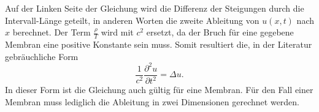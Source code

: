 Auf der Linken Seite der Gleichung wird die Differenz der Steigungen durch die Intervall-Länge geteilt, in anderen Worten die zweite Ableitung von $ u(x,t) $ nach $ x $ berechnet. Der Term $ \frac{\rho}{T} $ wird mit $ c^2 $ ersetzt, da der Bruch für eine gegebene Membran eine positive Konstante sein muss. Somit resultiert die, in der Literatur gebräuchliche Form 
\begin{equation}
	\frac{1}{c^2}\frac{\partial^2u}{\partial t^2} = \Delta u.
\end{equation}
In dieser Form ist die Gleichung auch gültig für eine Membran. Für den Fall einer Membran muss lediglich die Ableitung in zwei Dimensionen gerechnet werden.